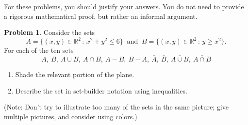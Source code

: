 \documentclass[12pt]{amsart}
\newcounter{problem_number}[section]
\theoremstyle{named}
\theoremstyle{definition}
\newtheorem{problem}{Problem}
\newcommand{\R}{\mathbb R}
\begin{document}
For these problems, you should justify your answers. You do not need to provide a rigorous mathematical proof, but rather an informal argument.


\begin{problem}
	Consider the sets
	$$A =\{(x,y)\in\R^2\,:\, x^2+y^2\leq 6\}\ \text{ and }\ B = \{(x,y)\in\R^2\,:\,y\geq x^2\}.$$ For each of the ten sets
	$$A,\  B,\  A\cup B,\  A\cap B,\  A-B,\  B-A,\  \overline A,\  \overline B,\  \overline{A\cup B},\  \overline{A\cap B}$$
	\begin{enumerate}
		\item Shade the relevant portion of the plane.
		\item Describe the set in set-builder notation using inequalities.
	\end{enumerate}
	(Note: Don't try to illustrate too many of the sets in the same picture; give multiple pictures, and consider using colors.)
\end{problem}
\end{document}
